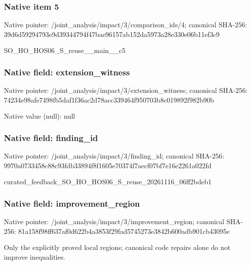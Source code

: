 \documentclass[10pt,a4paper]{article}
\begin{document}
\subsubsection{Native item 5}
Native pointer: /joint\_\allowbreak{}analysis/impact/3/comparison\_\allowbreak{}ids/4; canonical SHA-256: 39d6d59294793e9d39344794f47bae96157ab152da5973a28e330e06b11ef3c9

\begingroup\raggedright\sloppy SO\_\allowbreak{}HO\_\allowbreak{}HOS06\_\allowbreak{}S\_\allowbreak{}reuse\_\allowbreak{}\_\allowbreak{}main\_\allowbreak{}\_\allowbreak{}c5\par\endgroup

\subsubsection{Native field: extension\_\allowbreak{}witness}
Native pointer: /joint\_\allowbreak{}analysis/impact/3/extension\_\allowbreak{}witness; canonical SHA-256: 74234e98afe7498fb5daf1f36ac2d78acc339464f950703b8c019892f982b90b

Native value (null): null

\subsubsection{Native field: finding\_\allowbreak{}id}
Native pointer: /joint\_\allowbreak{}analysis/impact/3/finding\_\allowbreak{}id; canonical SHA-256: 9970a0733458c88c93fdb33894f8f1605e70374f7aecf07bf7e16e2261a022fd

\begingroup\raggedright\sloppy curated\_\allowbreak{}feedback\_\allowbreak{}SO\_\allowbreak{}HO\_\allowbreak{}HOS06\_\allowbreak{}S\_\allowbreak{}reuse\_\allowbreak{}20261116\_\allowbreak{}06ff2bdeb1\par\endgroup

\subsubsection{Native field: improvement\_\allowbreak{}region}
Native pointer: /joint\_\allowbreak{}analysis/impact/3/improvement\_\allowbreak{}region; canonical SHA-256: 81a158f98ff637af0d622b4a3853f29fad5745273e3842b600adb901cb43095e

\begingroup\raggedright\sloppy Only the explicitly proved local regions;\allowbreak{} canonical code repairs alone do not improve inequalities.\par\endgroup
\end{document}
